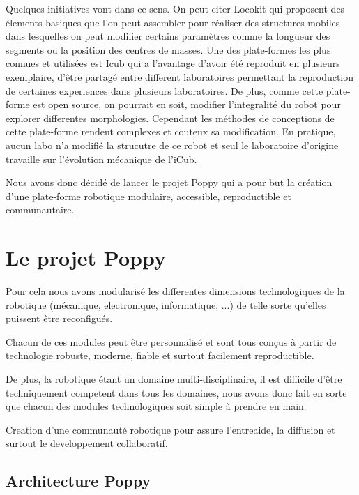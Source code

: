 Quelques initiatives vont dans ce sens. On peut citer Locokit qui proposent des élements basiques que l'on peut assembler pour réaliser des structures mobiles dans lesquelles on peut modifier certains paramètres comme la longueur des segments ou la position des centres de masses.
Une des plate-formes les plus connues et utilisées est Icub qui a l'avantage d'avoir été reproduit en plusieurs exemplaire, d'être partagé entre different laboratoires permettant la reproduction de certaines experiences dans plusieurs laboratoires. De plus, comme cette plate-forme est open source, on pourrait en soit, modifier l'integralité du robot pour explorer differentes morphologies. Cependant les méthodes de conceptions de cette plate-forme rendent complexes et couteux sa modification. En pratique, aucun labo n'a modifié la strucutre de ce robot et seul le laboratoire d'origine travaille sur l'évolution mécanique de l'iCub.


Nous avons donc décidé de lancer le projet Poppy qui a pour but la création d'une plate-forme robotique modulaire, accessible, reproductible et communautaire.

\section*{Le projet Poppy}
\label{sec:Le projet Poppy}


Pour cela nous avons modularisé les differentes dimensions technologiques de la robotique (mécanique, electronique, informatique, ...) de telle sorte qu'elles puissent être reconfigués.

Chacun de ces modules peut être personnalisé et sont tous conçus à partir de technologie robuste, moderne, fiable et surtout facilement reproductible.

De plus, la robotique étant un domaine multi-disciplinaire, il est difficile d'être techniquement competent dans tous les domaines, nous avons donc fait en sorte que chacun des modules technologiques soit simple à prendre en main.

Creation d'une communauté robotique pour assure l'entreaide, la diffusion et surtout le developpement collaboratif.


\subsection*{Architecture Poppy}

